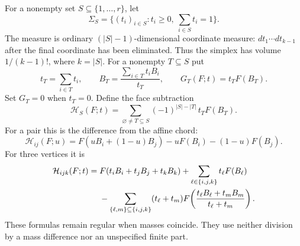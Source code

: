 For a nonempty set $S\subseteq\{1,\ldots,r\}$, let
\[
 \Sigma_S=\{(t_i)_{i\in S}:t_i\ge0,\ \sum_{i\in S}t_i=1\}.
\]
The measure is ordinary $(|S|-1)$-dimensional coordinate measure:
$dt_1\cdots dt_{k-1}$ after the final coordinate has been eliminated.
Thus the simplex has volume $1/(k-1)!$, where $k=|S|$.
For a nonempty $T\subseteq S$ put
\[
 t_T=\sum_{i\in T}t_i,\qquad
 B_T=\frac{\sum_{i\in T}t_i B_i}{t_T},\qquad
 G_T(F;t)=t_TF(B_T).
\]
Set $G_T=0$ when $t_T=0$.  Define the face subtraction
\begin{equation}\label{sd:eq:H}
 \boxed{\displaystyle
 \mathcal H_S(F;t)=
  \sum_{\varnothing\ne T\subseteq S}
       (-1)^{|S|-|T|}\,t_TF(B_T).}
\end{equation}
For a pair this is the difference from the affine chord:
\begin{equation}\label{sd:eq:Hpair}
 \mathcal H_{ij}(F;u)
   =F(uB_i+(1-u)B_j)-uF(B_i)-(1-u)F(B_j).
\end{equation}
For three vertices it is
\begin{align}\label{sd:eq:Htriple}
 \mathcal H_{ijk}(F;t)={}&F(t_iB_i+t_jB_j+t_kB_k)
                  +\sum_{\ell\in\{i,j,k\}}t_\ell F(B_\ell)\notag\\
 &-\sum_{\{\ell,m\}\subseteq\{i,j,k\}}
   (t_\ell+t_m)F\!\left(
            \frac{t_\ell B_\ell+t_mB_m}{t_\ell+t_m}\right).
\end{align}
These formulas remain regular when masses coincide.  They use neither
division by a mass difference nor an unspecified finite part.

